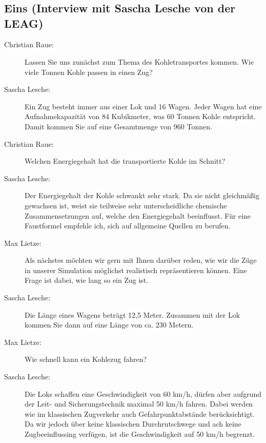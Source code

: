 \chapter{\appendixname}

\section*{Eins (Interview mit Sascha Lesche von der LEAG)}

\begin{description}

    \item[Christian Raue:] Lassen Sie uns zunächst zum Thema des Kohletransportes kommen. Wie viele Tonnen Kohle passen in einen Zug?

    \item[Sascha Lesche:] Ein Zug besteht immer aus einer Lok und 16 Wagen. Jeder Wagen hat eine Aufnahmekapazität von 84 Kubikmeter, was 60 Tonnen Kohle entspricht. Damit kommen Sie auf eine Gesamtmenge von 960 Tonnen.

    \item[Christian Raue:] Welchen Energiegehalt hat die transportierte Kohle im Schnitt?

    \item[Sascha Lesche:] Der Energiegehalt der Kohle schwankt sehr stark. Da sie nicht gleichmäßig gewachsen ist, weist sie teilweise sehr unterscheidliche chemische Zusammensetzungen auf, welche den Energiegehalt beeinflusst. Für eine Faustformel empfehle ich, sich auf allgemeine Quellen zu berufen.

    \item[Max Lietze:] Als nächstes möchten wir gern mit Ihnen darüber reden, wie wir die Züge in unserer Simulation möglichst realistisch repräsentieren können. Eine Frage ist dabei, wie lang so ein Zug ist.

    \item[Sascha Lesche:] Die Länge eines Wagens beträgt 12,5 Meter. Zusammen mit der Lok kommen Sie dann auf eine Länge von ca. 230 Metern.

    \item[Max Lietze:] Wie schnell kann ein Kohlezug fahren?

    \item[Sascha Lesche:] Die Loks schaffen eine Geschwindigkeit von 60 km/h, dürfen aber aufgrund der Leit- und Sicherungstechnik maximal 50 km/h fahren. Dabei werden wie im klassischen Zugverkehr auch Gefahrpunktabstände berücksichtigt. Da wir jedoch über keine klassischen Durchrutschwege und ach keine Zugbeeinflussing verfügen, ist die Geschwindigkeit auf 50 km/h begrenzt.


\end{description}
